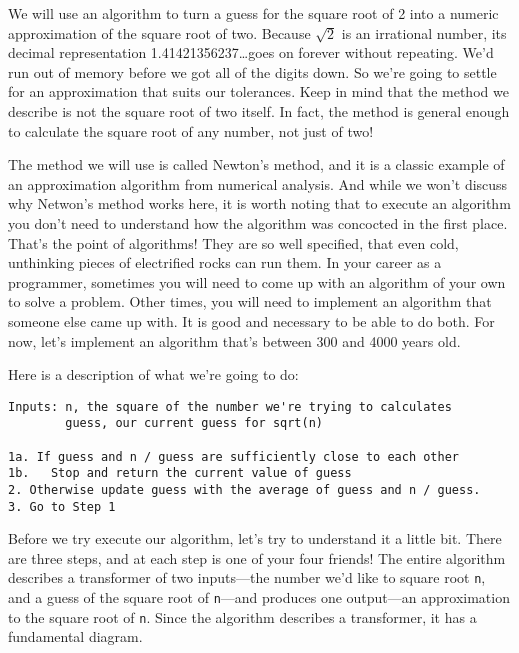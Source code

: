 We will use an algorithm to turn a guess for the square root of 2 into a numeric
approximation of the square root of two. Because $\sqrt{2}$ is an irrational
number, its decimal representation 1.41421356237\dots goes on forever without
repeating. We'd run out of memory before we got all of the digits down. So we're
going to settle for an approximation that suits our tolerances. Keep in mind that the method we
describe is not the square root of two itself. In fact, the method is general
enough to calculate the square root of any number, not just of two!

The method we will use is called Newton's method, and it is a classic example of
an approximation algorithm from numerical analysis. And while we won't discuss
why Netwon's method works here, it is worth noting that to execute an algorithm
you don't need to understand how the algorithm was concocted in the first place.
That's the point of algorithms! They are so well specified, that even cold,
unthinking pieces of electrified rocks can run them. In your career as a
programmer, sometimes you will need to come up with an algorithm of your own to
solve a problem. Other times, you will need to implement an algorithm that
someone else came up with. It is good and necessary to be able to do both. For
now, let's implement an algorithm that's between 300 and 4000 years
old.

Here is a description of what we're going to do:

\begin{lstlisting}[caption={Newton's method for calculating square roots}]
Inputs: n, the square of the number we're trying to calculates
        guess, our current guess for sqrt(n)

1a. If guess and n / guess are sufficiently close to each other
1b.   Stop and return the current value of guess
2. Otherwise update guess with the average of guess and n / guess.
3. Go to Step 1
\end{lstlisting}

Before we try execute our algorithm, let's try to understand it a little bit.
There are three steps, and at each step is one of your four friends! The entire
algorithm describes a transformer of two inputs---the number we'd like to square
root \texttt{n}, and a guess of the square root of \texttt{n}---and produces one
output---an approximation to the square root of \texttt{n}. Since the algorithm
describes a transformer, it has a fundamental diagram.

